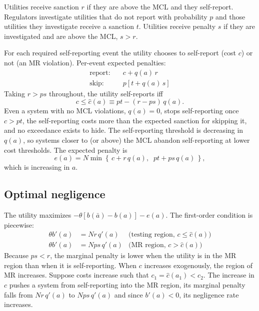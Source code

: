 \documentclass{article}
\begin{document}
Utilities receive sanction $r$ if they are above the MCL and they self-report. Regulators investigate utilities that do not report with probability $p$ and those utilities they investigate receive a sanction $t$. Utilities receive penalty $s$ if they are investigated and are above the MCL, $s>r$.


For each required self-reporting event the utility chooses to self-report (cost $c$) or not (an MR violation). Per-event expected penalties:
\begin{align*}
\text{report:} \quad & c + q(a)\,r \\
\text{skip:} \quad & p\left[t + q(a)\,s\right]
\end{align*}
Taking $r > ps$ throughout, the utility self-reports iff
\begin{equation}\label{eq:chat}
c \le \hat{c}(a) \equiv pt - (r - ps)\,q(a).
\end{equation}
Even a system with no MCL violations, $q(a) = 0$, stops self-reporting once $c > pt$, the self-reporting costs more than the expected sanction for skipping it, and no exceedance exists to hide. The self-reporting threshold is decreasing in $q(a)$, so systems closer to (or above) the MCL abandon self-reporting at lower cost thresholds. The expected penalty is
\begin{equation}\label{eq:endog_penalty}
e(a) = N \min\left\{\, c + r\,q(a),\;\; pt + ps\,q(a) \,\right\},
\end{equation}
which is increasing in $a$.

\subsection{Optimal negligence}

The utility maximizes $-\theta[b(\bar{a}) - b(a)] - e(a)$. The first-order condition is piecewise:
\begin{align}
\theta b'(a) &= N r\, q'(a) & \text{(testing region, } c \le \hat{c}(a)) \\
\theta b'(a) &= N ps\, q'(a) & \text{(MR region, } c > \hat{c}(a))
\end{align}
Because $ps < r$, the marginal penalty is lower when the utility is in the MR region than when it is self-reporting. When $c$ increases exogenously, the region of MR increases. Suppose costs increase such that $c_1 =\hat{c}(a_1) < c_2$. The increase in $c$ pushes a system from self-reporting into the MR region, its marginal penalty falls from $Nr\,q'(a)$ to $Nps\,q'(a)$ and since $b'(a)<0$, its negligence rate increases.
\end{document}
